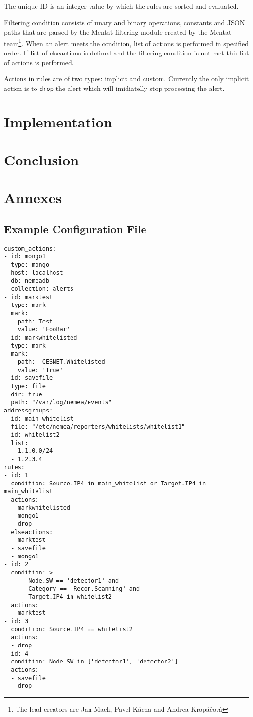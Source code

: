 \documentclass[11pt,a4paper]{article}
\begin{document}
The unique ID is an integer value by which the rules are sorted and evaluated.

Filtering condition consists of unary and binary operations, constants and JSON paths that are parsed by the Mentat filtering module created by the Mentat team\footnote{The lead creators are Jan Mach, Pavel Kácha and Andrea Kropáčová}. When an alert meets the condition, list of actions is performed in specified order. If list of elseactions is defined and the filtering condition is not met this list of actions is performed.

Actions in rules are of two types: implicit and custom. Currently the only implicit action is to \texttt{drop} the alert which will imidiatelly stop processing the alert.


\section{Implementation}



\section{Conclusion}



\newpage

\section{Annexes}
\subsection{Example Configuration File}
\label{configfile}

\begin{verbatim}
custom_actions:
- id: mongo1
  type: mongo
  host: localhost
  db: nemeadb
  collection: alerts
- id: marktest
  type: mark
  mark:
    path: Test
    value: 'FooBar'
- id: markwhitelisted
  type: mark
  mark:
    path: _CESNET.Whitelisted
    value: 'True'
- id: savefile
  type: file
  dir: true
  path: "/var/log/nemea/events"
addressgroups:
- id: main_whitelist
  file: "/etc/nemea/reporters/whitelists/whitelist1"
- id: whitelist2
  list:
  - 1.1.0.0/24
  - 1.2.3.4
rules:
- id: 1
  condition: Source.IP4 in main_whitelist or Target.IP4 in main_whitelist
  actions:
  - markwhitelisted
  - mongo1
  - drop
  elseactions:
  - marktest
  - savefile
  - mongo1
- id: 2
  condition: >
	   Node.SW == 'detector1' and
	   Category == 'Recon.Scanning' and
	   Target.IP4 in whitelist2
  actions:
  - marktest
- id: 3
  condition: Source.IP4 == whitelist2
  actions:
  - drop
- id: 4
  condition: Node.SW in ['detector1', 'detector2']
  actions:
  - savefile
  - drop
\end{verbatim}
\end{document}
